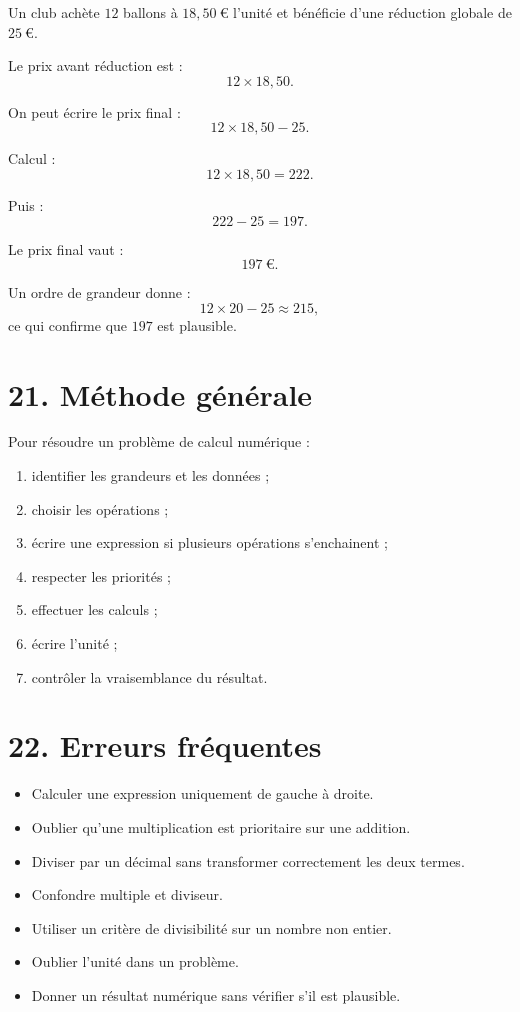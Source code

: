 Un club achète $12$ ballons à $18{,}50\ \text{€}$ l'unité et bénéficie d'une réduction globale de $25\ \text{€}$.

Le prix avant réduction est :
\[
12\times18{,}50.
\]

On peut écrire le prix final :
\[
12\times18{,}50-25.
\]

Calcul :
\[
12\times18{,}50=222.
\]

Puis :
\[
222-25=197.
\]

Le prix final vaut :
\[
\boxed{197\ \text{€}}.
\]

Un ordre de grandeur donne :
\[
12\times20-25\approx215,
\]
ce qui confirme que $197$ est plausible.

\section{21. Méthode générale}

\begin{methode}
Pour résoudre un problème de calcul numérique :
\begin{enumerate}
\item identifier les grandeurs et les données ;
\item choisir les opérations ;
\item écrire une expression si plusieurs opérations s'enchainent ;
\item respecter les priorités ;
\item effectuer les calculs ;
\item écrire l'unité ;
\item contrôler la vraisemblance du résultat.
\end{enumerate}
\end{methode}

\section{22. Erreurs fréquentes}

\begin{itemize}
\item Calculer une expression uniquement de gauche à droite.
\item Oublier qu'une multiplication est prioritaire sur une addition.
\item Diviser par un décimal sans transformer correctement les deux termes.
\item Confondre multiple et diviseur.
\item Utiliser un critère de divisibilité sur un nombre non entier.
\item Oublier l'unité dans un problème.
\item Donner un résultat numérique sans vérifier s'il est plausible.
\end{itemize}

